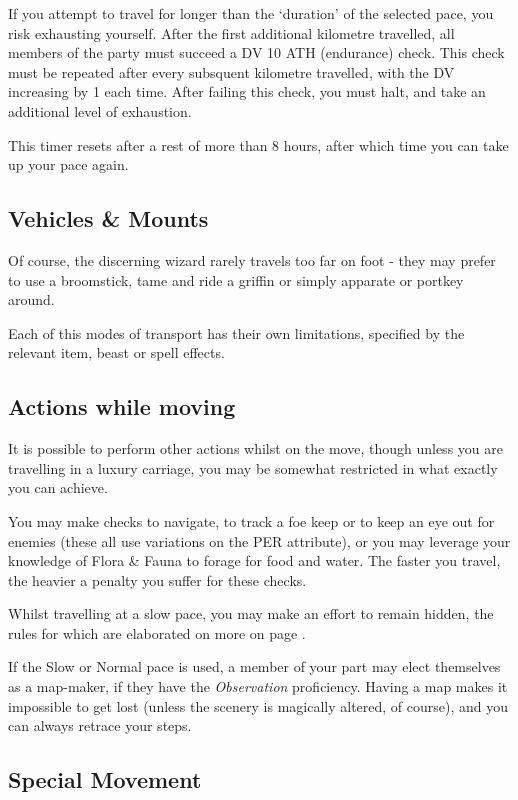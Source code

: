 If you attempt to travel for longer than the `duration' of the selected pace, you risk exhausting yourself. After the first additional kilometre travelled, all members of the party must succeed a DV 10 ATH (endurance) check. This check must be repeated after every subsquent kilometre travelled, with the DV increasing by 1 each time. After failing this check, you must halt, and take an additional level of exhaustion. 

This timer resets after a rest of more than 8 hours, after which time you can take up your pace again. 

\subsection{Vehicles \& Mounts}

Of course, the discerning wizard rarely travels too far on foot - they may prefer to use a broomstick, tame and ride a griffin or simply apparate or portkey around. 

Each of this modes of transport has their own limitations, specified by the relevant item, beast or spell effects. 

\subsection{Actions while moving}

It is possible to perform other actions whilst on the move, though unless you are travelling in a luxury carriage, you may be somewhat restricted in what exactly you can achieve. 

You may make checks to navigate, to track a foe keep or to keep an eye out for enemies (these all use variations on the PER attribute), or you may leverage your knowledge of Flora & Fauna to forage for food and water. The faster you travel, the heavier a penalty you suffer for these checks. 

Whilst travelling at a slow pace, you may make an effort to remain hidden, the rules for which are elaborated on more on page \pageref{S:Stealth}. 

If the Slow or Normal pace is used, a member of your part may elect themselves as a map-maker, if they have the {\it Observation} proficiency. Having a map makes it impossible to get lost (unless the scenery is magically altered, of course), and you can always retrace your steps. 

\subsection{Special Movement}

